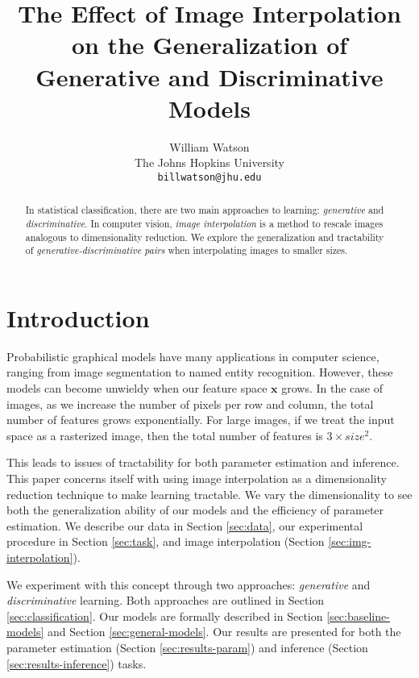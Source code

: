 \documentclass{article}
\title{The Effect of Image Interpolation on the Generalization of Generative and Discriminative Models}
\author{%
  William Watson \\
  The Johns Hopkins University\\
  \texttt{billwatson@jhu.edu} \\
}
\begin{document}

\maketitle

\begin{abstract}
  In statistical classification, there are two main approaches to learning:
  \textit{generative} and \textit{discriminative}. In computer vision,
  \textit{image interpolation} is a method to rescale images analogous to
  dimensionality reduction. We explore the generalization and tractability of
  \textit{generative-discriminative pairs} when interpolating images to smaller
  sizes.
\end{abstract}



\section{Introduction}
\label{sec:intro}
Probabilistic graphical models have many applications in computer science,
ranging from image segmentation to named entity recognition. However, these
models can become unwieldy when our feature space $\mathbf{x}$ grows. In the
case of images, as we increase the number of pixels per row and column, the
total number of features grows exponentially. For large images, if we treat
the input space as a rasterized image, then the total number of features is
$3 \times size^{2}$.

This leads to issues of tractability for both parameter estimation and
inference. This paper concerns itself with using image interpolation as
a dimensionality reduction technique to make learning tractable. We vary the
dimensionality to see both the generalization ability of our models and the
efficiency of parameter estimation. We describe our data in Section \ref{sec:data},
our experimental procedure in Section \ref{sec:task}, and image interpolation
(Section \ref{sec:img-interpolation}).

We experiment with this concept through two approaches: \textit{generative}
and \textit{discriminative} learning. Both approaches are outlined in Section
\ref{sec:classification}. Our models are formally described in Section
\ref{sec:baseline-models} and Section \ref{sec:general-models}. Our results
are presented for both the parameter estimation (Section \ref{sec:results-param})
and inference (Section \ref{sec:results-inference}) tasks.
\end{document}
